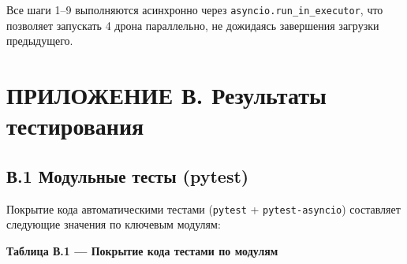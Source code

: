 \documentclass[14pt,a4paper]{extarticle}
\begin{document}
Все шаги 1--9 выполняются асинхронно через \texttt{asyncio.run\_in\_executor}, что позволяет запускать 4 дрона параллельно, не дожидаясь завершения загрузки предыдущего.


\hypertarget{ux43fux440ux438ux43bux43eux436ux435ux43dux438ux435-ux432.-ux440ux435ux437ux443ux43bux44cux442ux430ux442ux44b-ux442ux435ux441ux442ux438ux440ux43eux432ux430ux43dux438ux44f}{%
\section{ПРИЛОЖЕНИЕ В. Результаты тестирования}\label{ux43fux440ux438ux43bux43eux436ux435ux43dux438ux435-ux432.-ux440ux435ux437ux443ux43bux44cux442ux430ux442ux44b-ux442ux435ux441ux442ux438ux440ux43eux432ux430ux43dux438ux44f}}

\hypertarget{ux432.1-ux43cux43eux434ux443ux43bux44cux43dux44bux435-ux442ux435ux441ux442ux44b-pytest}{%
\subsection{В.1 Модульные тесты (pytest)}\label{ux432.1-ux43cux43eux434ux443ux43bux44cux43dux44bux435-ux442ux435ux441ux442ux44b-pytest}}

Покрытие кода автоматическими тестами (\texttt{pytest} + \texttt{pytest-asyncio}) составляет следующие значения по ключевым модулям:

\textbf{Таблица В.1 --- Покрытие кода тестами по модулям}
\end{document}
